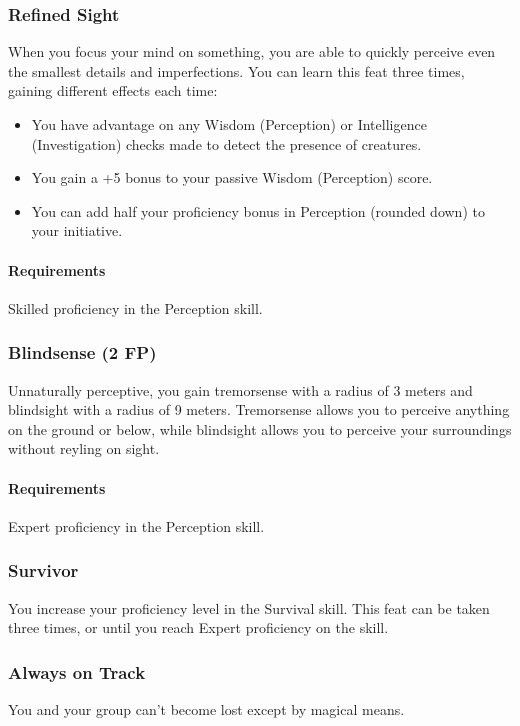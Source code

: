 \subsubsection{Refined Sight} \label{feat::refinedsight}
    When you focus your mind on something, you are able to quickly perceive even the smallest details and imperfections.
    You can learn this feat three times, gaining different effects each time:
    \begin{itemize}
        \item You have advantage on any Wisdom (Perception) or Intelligence (Investigation) checks made to detect the presence of creatures.
        \item You gain a +5 bonus to your passive Wisdom (Perception) score.
        \item You can add half your proficiency bonus in Perception (rounded down) to your initiative.
    \end{itemize}
    \paragraph{Requirements} Skilled proficiency in the Perception skill.
\subsubsection{Blindsense (2 FP)} \label{feat::blindsense}
    Unnaturally perceptive, you gain tremorsense with a radius of 3 meters and blindsight with a radius of 9 meters.
    Tremorsense allows you to perceive anything on the ground or below, while blindsight allows you to perceive your surroundings without reyling on sight.
    \paragraph{Requirements} Expert proficiency in the Perception skill.
\subsubsection{Survivor} \label{feat::survivor}
    You increase your proficiency level in the Survival skill.
    This feat can be taken three times, or until you reach Expert proficiency on the skill.
\subsubsection{Always on Track} \label{feat::alwaysontrack}
    You and your group can't become lost except by magical means.
